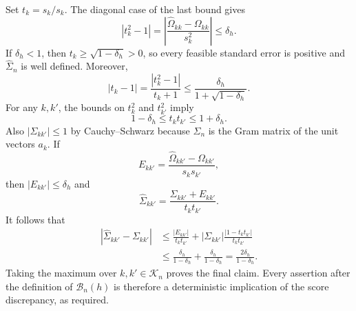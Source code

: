 Set \(t_k=\widehat s_k/s_k\).  The diagonal case of the last bound gives
\[
 |t_k^2-1|
 =\left|\frac{\widehat\Omega_{kk}-\Omega_{kk}}{s_k^2}\right|
 \le\delta_h.
\]
If \(\delta_h<1\), then
\(t_k\ge\sqrt{1-\delta_h}>0\), so every feasible standard error is
positive and \(\widehat\Sigma_n\) is well defined.  Moreover,
\[
 |t_k-1|
 =\frac{|t_k^2-1|}{t_k+1}
 \le\frac{\delta_h}{1+\sqrt{1-\delta_h}}.
\]
For any \(k,k'\), the bounds on \(t_k^2\) and \(t_{k'}^2\) imply
\[
 1-\delta_h\le t_kt_{k'}\le1+\delta_h.
\]
Also \(|\Sigma_{kk'}|\le1\) by Cauchy--Schwarz because \(\Sigma_n\) is
the Gram matrix of the unit vectors \(a_k\).  If
\[
 E_{kk'}=
 \frac{\widehat\Omega_{kk'}-\Omega_{kk'}}{s_ks_{k'}},
\]
then \(|E_{kk'}|\le\delta_h\) and
\[
 \widehat\Sigma_{kk'}
 =\frac{\Sigma_{kk'}+E_{kk'}}{t_kt_{k'}}.
\]
It follows that
\[
 \begin{aligned}
 |\widehat\Sigma_{kk'}-\Sigma_{kk'}|
 &\le \frac{|E_{kk'}|}{t_kt_{k'}}
 +|\Sigma_{kk'}|\frac{|1-t_kt_{k'}|}{t_kt_{k'}}\\
 &\le\frac{\delta_h}{1-\delta_h}
 +\frac{\delta_h}{1-\delta_h}
 =\frac{2\delta_h}{1-\delta_h}.
 \end{aligned}
\]
Taking the maximum over \(k,k'\in\mathcal K_n\) proves the final claim.
Every assertion after the definition of \(\mathcal B_n(h)\) is therefore
a deterministic implication of the score discrepancy, as required.
